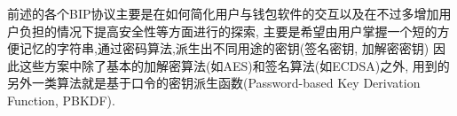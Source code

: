 \documentclass{article}
\begin{document}
前述的各个BIP协议主要是在如何简化用户与钱包软件的交互以及在不过多增加用户负担的情况下提高安全性等方面进行的探索,
主要是希望由用户掌握一个短的方便记忆的字符串,通过密码算法,派生出不同用途的密钥(签名密钥, 加解密密钥)
因此这些方案中除了基本的加解密算法(如AES)和签名算法(如ECDSA)之外,
用到的另外一类算法就是基于口令的密钥派生函数(Password-based Key Derivation Function, PBKDF).








\end{document}
